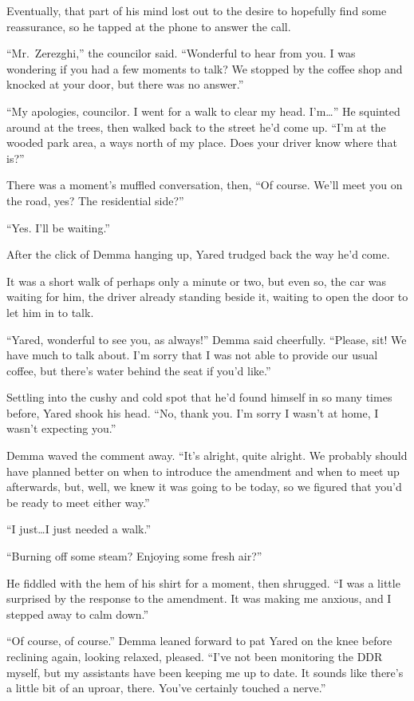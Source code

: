Eventually, that part of his mind lost out to the desire to hopefully find some reassurance, so he tapped at the phone to answer the call.

``Mr.~Zerezghi,'' the councilor said. ``Wonderful to hear from you. I was wondering if you had a few moments to talk? We stopped by the coffee shop and knocked at your door, but there was no answer.''

``My apologies, councilor. I went for a walk to clear my head. I'm\ldots{}'' He squinted around at the trees, then walked back to the street he'd come up. ``I'm at the wooded park area, a ways north of my place. Does your driver know where that is?''

There was a moment's muffled conversation, then, ``Of course. We'll meet you on the road, yes? The residential side?''

``Yes. I'll be waiting.''

After the click of Demma hanging up, Yared trudged back the way he'd come.

It was a short walk of perhaps only a minute or two, but even so, the car was waiting for him, the driver already standing beside it, waiting to open the door to let him in to talk.

``Yared, wonderful to see you, as always!'' Demma said cheerfully. ``Please, sit! We have much to talk about. I'm sorry that I was not able to provide our usual coffee, but there's water behind the seat if you'd like.''

Settling into the cushy and cold spot that he'd found himself in so many times before, Yared shook his head. ``No, thank you. I'm sorry I wasn't at home, I wasn't expecting you.''

Demma waved the comment away. ``It's alright, quite alright. We probably should have planned better on when to introduce the amendment and when to meet up afterwards, but, well, we knew it was going to be today, so we figured that you'd be ready to meet either way.''

``I just\ldots I just needed a walk.''

``Burning off some steam? Enjoying some fresh air?''

He fiddled with the hem of his shirt for a moment, then shrugged. ``I was a little surprised by the response to the amendment. It was making me anxious, and I stepped away to calm down.''

``Of course, of course.'' Demma leaned forward to pat Yared on the knee before reclining again, looking relaxed, pleased. ``I've not been monitoring the DDR myself, but my assistants have been keeping me up to date. It sounds like there's a little bit of an uproar, there. You've certainly touched a nerve.''

